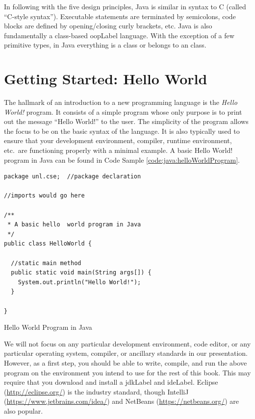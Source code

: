 In following with the five design principles, Java is similar in syntax to
C (called ``C-style syntax'').  Executable statements are terminated
by semicolons, code blocks are defined by opening/closing curly brackets, 
etc.  Java is also fundamentally a class-based \gls{oopLabel} language.
With the exception of a few primitive types, in Java everything is
a class or belongs to an class.

\section{Getting Started: Hello World}

The hallmark of an introduction to a new programming language is the \emph{Hello World!}
program.  It consists of a simple program whose only purpose is to print out the message
``Hello World!'' to the user.  The simplicity of the program allows the
focus to be on the basic syntax of the language.  It is also typically used to ensure that 
your development environment, compiler, runtime environment, etc.\ are functioning 
properly with a minimal example.  A basic Hello World! program in Java can be found in 
Code Sample \ref{code:java:helloWorldProgram}.

\begin{listing}
\begin{verbatim}
package unl.cse;  //package declaration

//imports would go here

/**
 * A basic hello  world program in Java
 */
public class HelloWorld {

  //static main method
  public static void main(String args[]) {
    System.out.println("Hello World!");
  }

}
\end{verbatim}
\caption{Hello World Program in Java}
\label{code:java:helloWorldProgram}
\end{listing}

We will not focus on any particular development environment, code editor, or any 
particular operating system, compiler, or ancillary standards in our presentation.  
However, as a first step, you should be able to write, compile, and run the above 
program on the environment you intend to use for the rest of this book.  This may 
require that you download and install a \gls{jdkLabel} and \gls{ideLabel}.  Eclipse
(\url{http://eclipse.org/}) is the industry standard, though IntelliJ (\url{https://www.jetbrains.com/idea/})
and NetBeans (\url{https://netbeans.org/}) are also popular.

